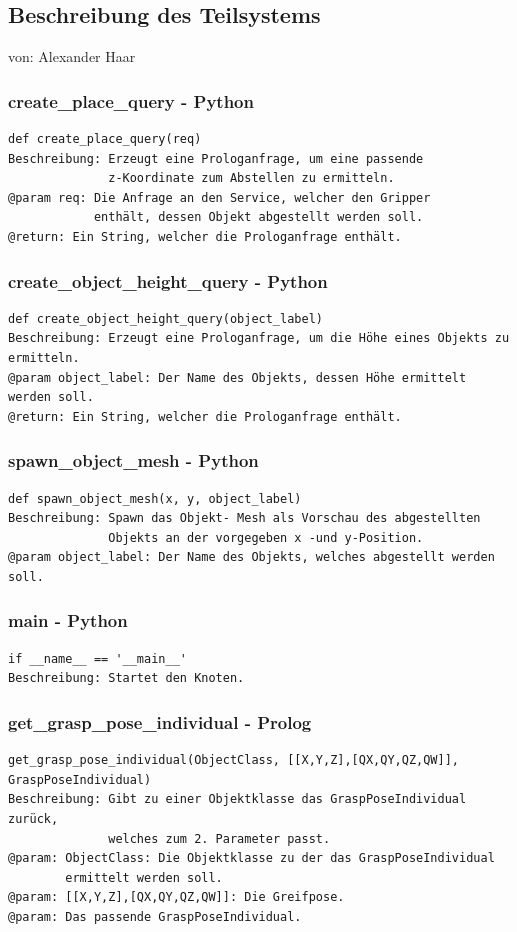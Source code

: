 \documentclass{suturo}
\makeatletter
\newcommand{\chapterauthor}[1]{%
  {\parindent0pt\vspace*{-27pt}%
  \linespread{0}\small\begin{flushright}von: #1\end{flushright}%
  \par\nobreak\vspace*{0pt}}
  \@afterheading%
}
\makeatother
\begin{document}
\subsection{Beschreibung des Teilsystems}
\chapterauthor{Alexander Haar}

\subsubsection{create\_place\_query - Python}
\begin{verbatim}
def create_place_query(req)
Beschreibung: Erzeugt eine Prologanfrage, um eine passende 
              z-Koordinate zum Abstellen zu ermitteln.
@param req: Die Anfrage an den Service, welcher den Gripper 
            enthält, dessen Objekt abgestellt werden soll.
@return: Ein String, welcher die Prologanfrage enthält.
\end{verbatim}

\subsubsection{create\_object\_height\_query - Python}
\begin{verbatim}
def create_object_height_query(object_label)
Beschreibung: Erzeugt eine Prologanfrage, um die Höhe eines Objekts zu ermitteln.
@param object_label: Der Name des Objekts, dessen Höhe ermittelt werden soll.
@return: Ein String, welcher die Prologanfrage enthält.
\end{verbatim}

\subsubsection{spawn\_object\_mesh - Python}
\begin{verbatim}
def spawn_object_mesh(x, y, object_label)
Beschreibung: Spawn das Objekt- Mesh als Vorschau des abgestellten 
              Objekts an der vorgegeben x -und y-Position.
@param object_label: Der Name des Objekts, welches abgestellt werden soll.
\end{verbatim}

\subsubsection{main - Python}
\begin{verbatim}
if __name__ == '__main__'
Beschreibung: Startet den Knoten.
\end{verbatim}


\subsubsection{get\_grasp\_pose\_individual - Prolog}
\begin{verbatim}
get_grasp_pose_individual(ObjectClass, [[X,Y,Z],[QX,QY,QZ,QW]], GraspPoseIndividual)
Beschreibung: Gibt zu einer Objektklasse das GraspPoseIndividual zurück, 
              welches zum 2. Parameter passt.
@param: ObjectClass: Die Objektklasse zu der das GraspPoseIndividual 
        ermittelt werden soll.
@param: [[X,Y,Z],[QX,QY,QZ,QW]]: Die Greifpose.
@param: Das passende GraspPoseIndividual.
\end{verbatim}
\end{document}
